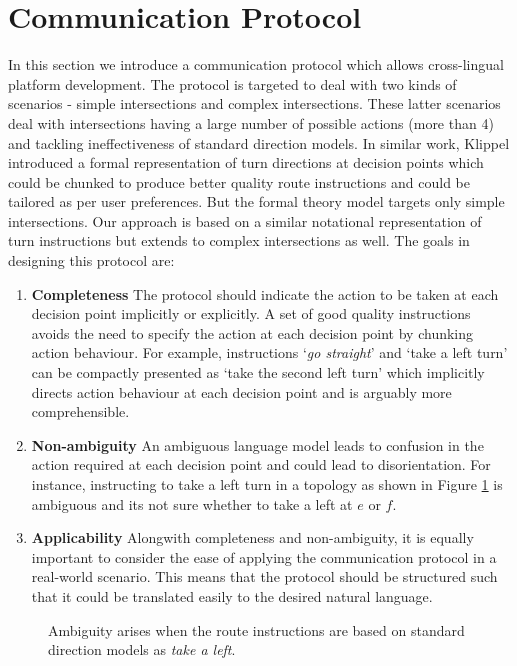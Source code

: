 \documentclass{iitkthesis}
\begin{document}
  \section{Communication Protocol}
In this section we introduce a communication protocol which allows
cross-lingual platform development. The protocol is targeted to deal with 
two kinds of scenarios - simple intersections and complex intersections. 
These latter scenarios deal with intersections having a 
large number of possible actions (more than 4) and tackling 
ineffectiveness of standard direction models. In similar 
work, Klippel \cite{klippel} introduced a formal representation of turn 
directions at decision points which could be chunked to produce better 
quality route instructions and could be tailored as per user preferences. 
But the formal theory model targets only simple intersections. Our 
approach is based on a similar notational representation of turn 
instructions but extends to complex intersections as well. The goals in 
designing this protocol are: 
\begin{enumerate}
\item \textbf{Completeness}
The protocol should indicate the action to be taken at each decision 
point implicitly or explicitly. A set of good quality instructions avoids 
the need to specify the action at each decision point by chunking action 
behaviour. For example, instructions `\textit{go straight}' and 
‘take a left turn’ can be compactly presented as ‘take the second left 
turn’ which implicitly directs action behaviour at each decision point 
and is arguably more comprehensible. 
\item \textbf{Non-ambiguity}
An ambiguous language model leads to confusion in the action required at each 
decision point and could lead to disorientation. For instance, 
instructing to take a left turn in a topology as shown in Figure 
\ref{fig:turnA} is ambiguous and its not sure whether to take a left at 
$e$ or $f$.
\item \textbf{Applicability}
Alongwith completeness and non-ambiguity, it is equally important to 
consider the ease of applying the communication protocol in a real-world 
scenario. This means that the protocol should be structured such that it 
could be translated easily to the desired natural language.
\end{enumerate}
 \begin{figure}
\centering
\caption{Ambiguity arises when the route instructions are based on 
standard direction models as \textit{take a left}.}
\label{fig:turnA}
 \end{figure}
\end{document}
